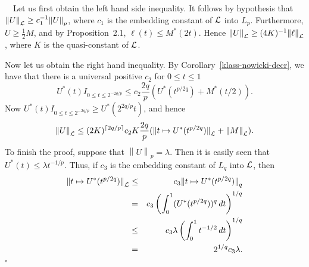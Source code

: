\documentclass[12pt]{article}
\newcommand{\cL}{{\cal L}}
\newcommand{\normo}[1]{{\left\|#1\right\|}}
\newcommand{\snormo}[1]{{\mathopen\|#1\mathclose\|}}
\newcommand{\Proof}{\medskip\noindent{\bf Proof:}\ \ }
\newcommand{\qed}{\leavevmode\unskip\penalty9999
                  \hbox{}\nobreak\hfill$\square$\goodbreak\medskip}
\begin{document}
\Proof   Let us first obtain the left hand side
inequality. It follows by hypothesis that $\normo U_\cL \ge c_1^{-1}
\normo U_p$, where $c_1$ is the embedding constant of $\cL$ into
$L_p$. Furthermore, $U \ge {\frac{1}{ 2}} M$, and by Proposition~2.1, 
$\ell(t) \le M^*(2t)$. Hence $ \normo U_\cL \ge (4K)^{-1}
\normo\ell_\cL$, where $K$ is the quasi-constant of $\cL$. 

Now let us obtain the right hand inequality. 
By Corollary~\ref{klass-nowicki-decr}, we
have that 
there is a universal positive $c_2$ for $0 \le t \le 1$ 
$$ U^*(t) I_{0\le t \le 2^{-2q/p}} \le c_2 {\frac{2q }{ p}}
(U^*(t^{p/2q}) + 
M^*(t/2)). $$ 
Now $U^*(t) I_{0\le t \le 2^{-2q/p}} \ge U^*(2^{2q/p}
t)$, and hence $$ \normo U_{\cL} \le (2K)^{\lceil 2q/p \rceil} c_2 K
{\frac{2q}{ p}} (\snormo{t\mapsto U^*(t^{p/2q})}_\cL + \normo M_\cL) .$$
To finish the 
proof, suppose that $\normo U_p = \lambda$.  Then it is easily seen that
$U^*(t) \le \lambda t^{-1/p}$.  Thus, if $c_3$ is the embedding
constant of 
$L_q$ into $\cL$, then 
\begin{eqnarray*}
  \snormo{t\mapsto U^*(t^{p/2q})}_\cL   
  &\le& c_3 \snormo{t\mapsto U^*(t^{p/2q})}_q \\
  &=& c_3 \left(\int_0^1 (U^*(t^{p/2q}))^q \, dt \right)^{1/q} \\  
  &\le& c_3 \lambda \left(\int_0^1 t^{-1/2} \, dt\right)^{1/q} \\  
  &=&   2^{1/q} c_3 \lambda . 
\end{eqnarray*} 
\qed
\end{document}
